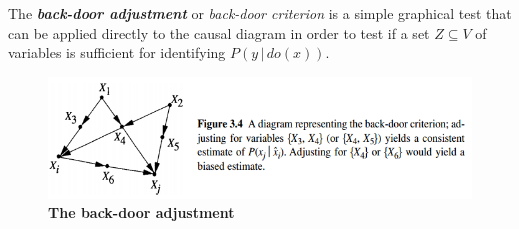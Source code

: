 \documentclass[11pt]{article}
\begin{document}
The \textbf{\emph{back-door adjustment}} or \emph{back-door criterion} \citep{pearl2000causal} is a simple graphical test that can be applied directly to the causal diagram in order to test if a set $Z \subseteq V$ of variables is sufficient for identifying $P(y \,|\,do(x))$.

\begin{figure}
\begin{minipage}[t]{1\linewidth}
  \centering
  \centerline{\includegraphics[scale = 0.6]{backdoor.png}}
\end{minipage}
\caption{\footnotesize{\textbf{The back-door adjustment  \citep{pearl2000causal}}}}
\label{fig: backdoor}
\end{figure}
\end{document}
